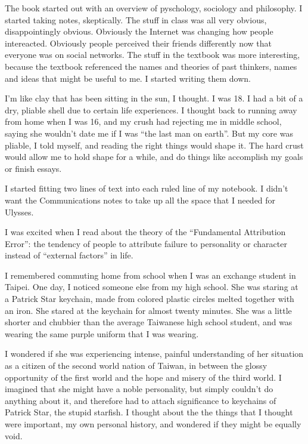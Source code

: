 The book started out with an overview of pyschology, sociology and philosophy.
I started taking notes, skeptically.  The stuff in class was all very obvious,
disappointingly obvious.  Obviously the Internet was changing how people
intereacted.  Obviously people perceived their friends differently now that
everyone was on social networks.  The stuff in the textbook was more
interesting, because the textbook referenced the names and theories of past
thinkers, names and ideas that might be useful to me.  I started writing them
down. 

I'm like clay that has been sitting in the sun, I thought.  I was 18.  I had a
bit of a dry, pliable shell due to certain life experiences.  I thought back to
running away from home when I was 16, and my crush had rejecting me in middle
school, saying she wouldn't date me if I was ``the last man on earth''.  But my
core was pliable, I told myself, and reading the right things would shape it.
The hard crust  would allow me to hold shape for a while, and do things like
accomplish my goals or finish essays.

I started fitting two lines of text into each ruled line of my
notebook.  I didn't want the Communications notes to take up all the space that
I needed for Ulysses.  

I was excited when I read about the theory of the ``Fundamental Attribution
Error'': the tendency of people to attribute failure to personality or character
instead of ``external factors'' in life. 

I remembered commuting home from school when I was an exchange student in
Taipei.  One day, I noticed someone else from my high school.  She was staring
at a Patrick Star keychain, made from colored plastic circles melted together
with an iron.  She stared at the keychain for almost twenty minutes.  She was a
little shorter and chubbier than the average Taiwanese high school student, and
was wearing the same purple uniform that I was wearing.

I wondered if she was experiencing intense, painful understanding of her
situation as a citizen of the second world nation of Taiwan, in between the
glossy opportunity of the first world and the hope and misery of the third
world.  I imagined that she might have a noble personality, but simply couldn't
do anything about it, and therefore had to attach significance to keychains of
Patrick Star, the stupid starfish.  I thought about the the things that I
thought were important, my own personal history, and wondered if they might be
equally void.

